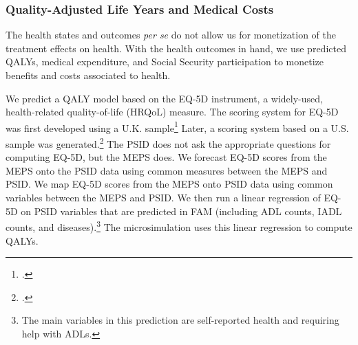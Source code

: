 \subsubsection{Quality-Adjusted Life Years and Medical Costs} \label{section:qalys}

\noindent The health states and outcomes \textit{per se} do not allow us for monetization of the treatment effects on health. With the health outcomes in hand, we use predicted QALYs, medical expenditure, and Social Security participation to monetize benefits and costs associated to health.

We predict a QALY model based on the EQ-5D instrument, a widely-used, health-related quality-of-life (HRQoL) measure. The scoring system for EQ-5D was first developed using a U.K. sample\footnote{\citet{Dolan_1997_Modeling_MC}.} Later, a scoring system based on a U.S. sample was generated.\footnote{\citet{Shaw_etal_2005_EQ5D_MC}.} The PSID does not ask the appropriate questions for computing EQ-5D, but the MEPS does. We forecast EQ-5D scores from the MEPS onto the PSID data using common measures between the MEPS and PSID. We map EQ-5D scores from the MEPS onto PSID data using common variables between the MEPS and PSID. We then run a linear regression of EQ-5D on PSID variables that are predicted in FAM (including ADL counts, IADL counts, and diseases).\footnote{The main variables in this prediction are self-reported health and requiring help with ADLs.} The microsimulation uses this linear regression to compute QALYs.

